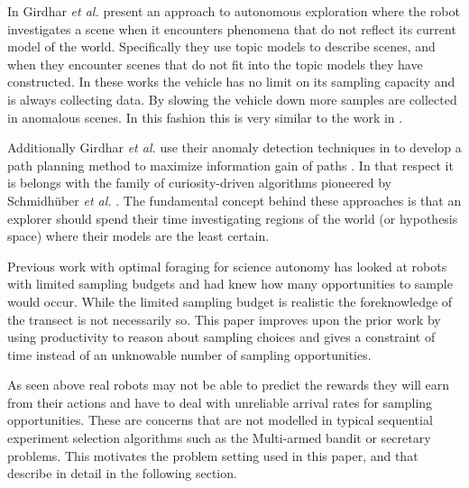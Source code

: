 In \cite{girdhar2013autonomous}  Girdhar
\emph{et al.} present an approach to autonomous exploration where the robot
investigates a scene when it encounters phenomena that do not reflect its
current model of the world.  Specifically they use topic models to describe
scenes, and when they encounter scenes that do not fit into the topic models
they have constructed.  In these works the vehicle has no limit on its sampling
capacity and is always collecting data.  By slowing the vehicle down more
samples are collected in anomalous scenes.  In this fashion this is very
similar to the work in \cite{thompson2013adaptive}.

Additionally Girdhar \emph{et al.} use their anomaly detection techniques in
\cite{girdhar2013autonomous} to develop a path planning method to maximize
information gain of paths \cite{girdhar2014curiosity}.  In that respect it is
belongs with the family of curiosity-driven algorithms pioneered by
Schmidh{\"u}ber \emph{et al.} 
\cite{sun2011planning}.  The fundamental concept behind these approaches is
that an explorer should spend their time investigating regions of the world (or
hypothesis space) where their models are the least certain.


Previous work with optimal foraging for science autonomy has looked at robots with limited sampling budgets \cite{furlong2014unknown} and had knew how many opportunities to sample would occur.  While the limited sampling budget is realistic the foreknowledge of the transect is not necessarily so.  This paper improves upon the prior work by using productivity to reason about sampling choices and gives a constraint of time instead of an unknowable number of sampling opportunities.


As seen above real robots may not be able to predict the rewards they will earn from their actions and have to deal with unreliable arrival rates for sampling opportunities.  These are concerns that are not modelled in typical sequential experiment selection algorithms such as the Multi-armed bandit or secretary problems.  This motivates the problem setting used in this paper, and that describe in detail in the following section.

